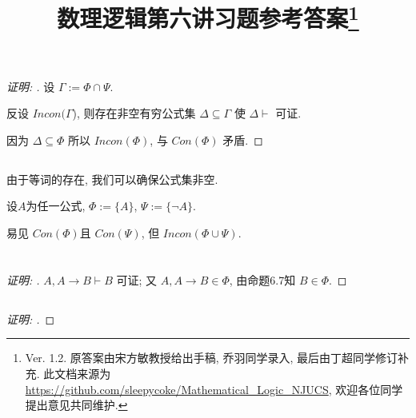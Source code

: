 \documentclass{article}
\begin{document}
\begin{CJK*}{UTF8}{gbsn}
\title{数理逻辑第六讲习题参考答案\footnote{Ver. 1.2. 原答案由宋方敏教授给出手稿, 乔羽同学录入, 最后由丁超同学修订补充. 此文档来源为\mbox{\url{https://github.com/sleepycoke/Mathematical_Logic_NJUCS}},
 欢迎各位同学提出意见共同维护. 
}}
\maketitle
\section{}
\subsection{}
\begin{proof}[\emph{证明: }]	
设 $\Gamma := \Phi \cap \Psi $.  

反设 $Incon(\Gamma$), 则存在非空有穷公式集 $\Delta \subseteq \Gamma$ 使 $\Delta \vdash$ 可证.  

因为 $\Delta \subseteq \Phi $ 所以 $Incon(\Phi)$, 与 $Con (\Phi)$ 矛盾. 
\end{proof}


\subsection{}
由于等词的存在, 我们可以确保公式集非空. 

设$A$为任一公式,
$\Phi := \{ A\}$, $\Psi := \{  \neg A \}$. 

易见 $Con ({\Phi})$且 $Con ({\Psi})$, 但 $Incon (\Phi \cup \Psi)$.

\section{}
\subsection{}
\begin{proof}[\emph{证明: }]
$A , A \rightarrow B \vdash B$ 可证; 又 $A,A\rightarrow B \in \Phi$, 
由命题6.7知 $B \in \Phi$. 
\end{proof}

\subsection{}
\begin{proof}[\emph{证明: }]


\end{proof}
\end{CJK*}
\end{document}
